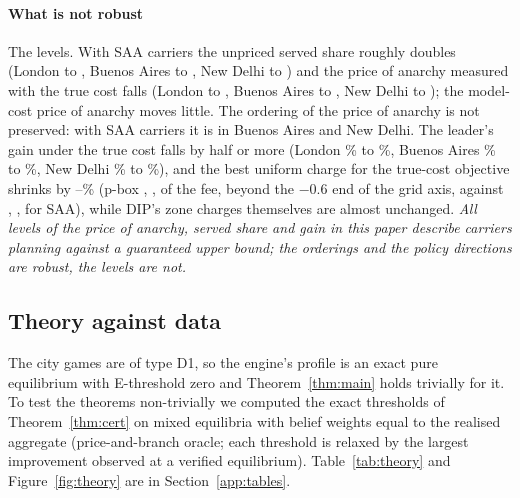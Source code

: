 \documentclass[preprint,11pt]{elsarticle}
\theoremstyle{definition}
\theoremstyle{remark}
\begin{document}
\paragraph{What is not robust} The levels. With SAA carriers the unpriced served share roughly doubles (London \CritPbServedLondon{} to \CritSaaServedLondon, Buenos Aires \CritPbServedBuenosAires{} to \CritSaaServedBuenosAires, New Delhi \CritPbServedNewDelhi{} to \CritSaaServedNewDelhi) and the price of anarchy measured with the true cost falls (London \CritPbPoaTrueLondon{} to \CritSaaPoaTrueLondon, Buenos Aires \CritPbPoaTrueBuenosAires{} to \CritSaaPoaTrueBuenosAires, New Delhi \CritPbPoaTrueNewDelhi{} to \CritSaaPoaTrueNewDelhi); the model-cost price of anarchy moves little. The ordering of the price of anarchy is not preserved: with SAA carriers it is \CritSaaBAND{} in Buenos Aires and New Delhi. The leader's gain under the true cost falls by half or more (London \CritPbDipTrueLondon\% to \CritSaaDipTrueLondon\%, Buenos Aires \CritPbDipTrueBuenosAires\% to \CritSaaDipTrueBuenosAires\%, New Delhi \CritPbDipTrueNewDelhi\% to \CritSaaDipTrueNewDelhi\%), and the best uniform charge for the true-cost objective shrinks by \CritChargeDropMin--\CritChargeDropMax\% (p-box \CritPbChargeLondon, \CritPbChargeBuenosAires, \CritPbChargeNewDelhi{} of the fee, beyond the $-0.6$ end of the grid axis, against \CritSaaChargeLondon, \CritSaaChargeBuenosAires, \CritSaaChargeNewDelhi{} for SAA), while DIP's zone charges themselves are almost unchanged. \emph{All levels of the price of anarchy, served share and gain in this paper describe carriers planning against a guaranteed upper bound; the orderings and the policy directions are robust, the levels are not.}

\subsection{Theory against data}\label{sec:res-theory}

The city games are of type D1, so the engine's profile is an exact pure equilibrium with E-threshold zero and Theorem~\ref{thm:main} holds trivially for it. To test the theorems non-trivially we computed the exact thresholds of Theorem~\ref{thm:cert} on mixed equilibria with belief weights equal to the realised aggregate (price-and-branch oracle; each threshold is relaxed by the largest improvement observed at a verified equilibrium). Table~\ref{tab:theory} and Figure~\ref{fig:theory} are in Section~\ref{app:tables}.
\end{document}
